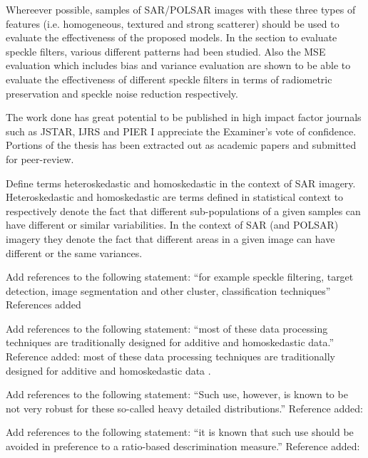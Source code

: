 \replyToComment
    {Whereever possible, samples of SAR/POLSAR images with these three types of features (i.e. homogeneous, textured and strong scatterer) should be used to evaluate the effectiveness of the proposed models.}
    {In the section to evaluate speckle filters, various different patterns had been studied. Also the MSE evaluation which includes bias and variance evaluation are shown to be able to evaluate the effectiveness of different speckle filters in terms of radiometric preservation and speckle noise reduction respectively.}
    
\replyToComment
    {The work done has great potential to be published in high impact factor journals such as JSTAR, IJRS and PIER}
    {I appreciate the Examiner's vote of confidence. Portions of the thesis has been extracted out as academic papers and submitted for peer-review.}    

\replyToComment
    {Define terms heteroskedastic and homoskedastic in the context of SAR imagery.}
    {Heteroskedastic and homoskedastic are terms defined in statistical context to respectively denote the fact that different sub-populations of a given samples can have different or similar variabilities. In the context of SAR (and POLSAR) imagery they denote the fact that different areas in a given image can have different or the same variances.}

\replyToComment
    {Add references to the following statement: ``for example speckle filtering, target detection, image segmentation and other cluster, classification techniques''}
    {References added \cite{Lopez-Martinez_2003_TGRS_2232, Alberga_2008_IJRS_4129, Conradsen_2003_TGRS_4}}

\replyToComment
    {Add references to the following statement: ``most of these data processing techniques are traditionally designed for additive and homoskedastic data.''}
    {Reference added: most of these data processing techniques are traditionally designed for additive and homoskedastic data \cite{Dutch_LNCS_2004}.}

\replyToComment
    {Add references to the following statement: ``Such use, however, is known to be not very robust for these so-called heavy detailed distributions.''}
    {Reference added: \cite{McElroy_Econometric_2002}}
    
\replyToComment
    {Add references to the following statement: ``it is known that such use should be avoided in preference to a ratio-based descrimination measure.''}
    {Reference added: \cite{Rignot_1993_TGRS_896}}

